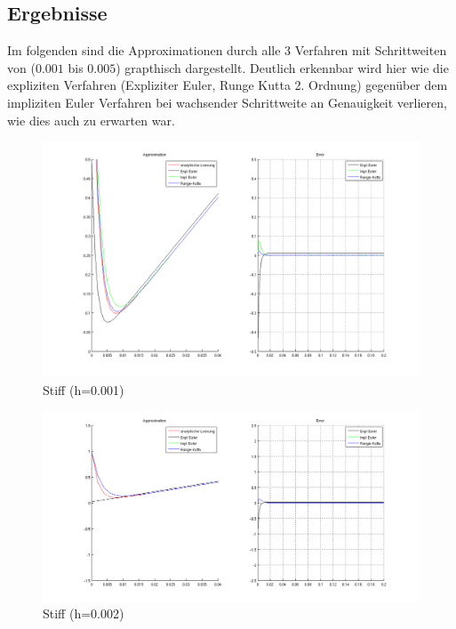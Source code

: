 \documentclass[10pt]{scrartcl}
\begin{document}
\subsection{Ergebnisse}
	Im folgenden sind die Approximationen durch alle 3 Verfahren mit Schrittweiten von ($0.001$ bis $0.005$) grapthisch dargestellt. Deutlich erkennbar wird hier wie die expliziten Verfahren (Expliziter Euler, Runge Kutta 2. Ordnung) gegenüber dem impliziten Euler Verfahren bei wachsender Schrittweite an Genauigkeit verlieren, wie dies auch zu erwarten war.

		\begin{figure}[H]
			\centering	
			\includegraphics[width=\textwidth]{stiff0001.png}
            \caption{Stiff (h=0.001)}
            \label{pic:stuff001}
		\end{figure} 
	
	
	\begin{figure}[H]
			\centering	
			\includegraphics[width=\textwidth]{stiff0002.png}
            \caption{Stiff (h=0.002)}
            \label{pic:stuff002}
		\end{figure} 
	
\end{document}
